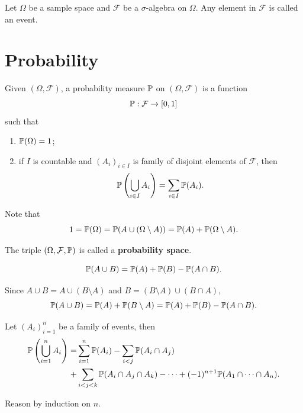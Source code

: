 \begin{definitionbox}
    Let $\Omega$ be a sample space and $\mathcal{F}$ be a $\sigma$-algebra on $\Omega$. 
    Any element in $\mathcal{F}$ is called an event.
\end{definitionbox}

\section{Probability}

\begin{definitionbox}
    Given $(\Omega, \mathcal{F})$, a probability measure $\mathbb{P}$ on $(\Omega, \mathcal{F})$ is a function
    $$\mathbb{P}: \mathcal{F}\to [0,1]$$
    such that 
    \begin{enumerate}[label=(\alph*)]
        \item $\mathbb{P}(\Omega) = 1$;
        \item if $I$ is countable and $(A_i)_{i \in I}$ is family of disjoint elements of $\mathcal{F}$, then
        $$\mathbb{P}\left(\bigcup_{i \in I} A_i\right) = \sum_{i \in I} \mathbb{P}(A_i).$$
    \end{enumerate}
    Note that
    $$1 = \mathbb{P}(\Omega) = \mathbb{P}(A \cup (\Omega \setminus A)) = \mathbb{P}(A) + \mathbb{P}(\Omega \setminus A).$$
    
    The triple $(\Omega, \mathcal{F}, \mathbb{P})$ is called a \textbf{probability space}.
\end{definitionbox}

\begin{lemmabox}
    $$\mathbb{P}(A \cup B) = \mathbb{P}(A) + \mathbb{P}(B) - \mathbb{P}(A \cap B).$$
\end{lemmabox}
\begin{proofbox}
    Since $A \cup B = A \cup (B \setminus A)$ and $B = (B \setminus A) \cup (B \cap A)$,
    $$\mathbb{P}(A \cup B) = \mathbb{P}(A) + \mathbb{P}(B \setminus A) = \mathbb{P}(A) + \mathbb{P}(B) - \mathbb{P}(A \cap B).$$
\end{proofbox}

\begin{lemmabox}
    Let $(A_i)_{i=1}^{n}$ be a family of events, then
    $$\begin{aligned}
        \mathbb{P}\left(\bigcup_{i=1}^{n}A_i\right) = & \sum_{i=1}^{n} \mathbb{P}(A_i) - \sum_{i<j} \mathbb{P}(A_{i} \cap A_{j})\\ + & \sum_{i < j < k}\mathbb{P}(A_{i} \cap A_{j} \cap A_{k}) - \cdots + (-1)^{n + 1}\mathbb{P}(A_1 \cap \cdots \cap A_{n}).
    \end{aligned}$$
\end{lemmabox}
\begin{proofbox}
    Reason by induction on $n$.
\end{proofbox}

